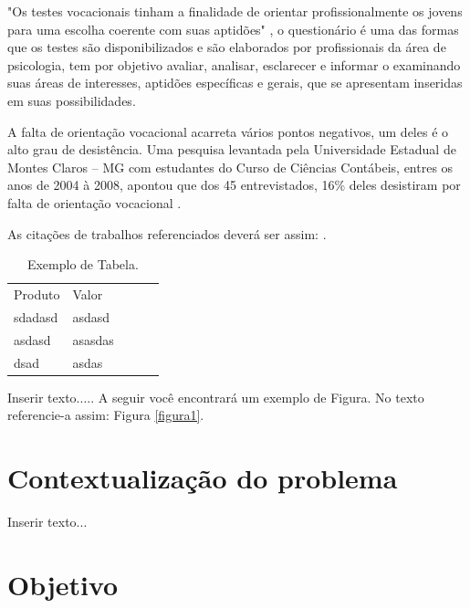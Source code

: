 \documentclass[
	12pt,				%
    oneside,			%
	a4paper,			%
	english,			%
	french,				%
	spanish,			%
	brazil,				%
	]{abntex2}
\begin{document}
"Os testes vocacionais tinham a finalidade de orientar profissionalmente os jovens para uma escolha coerente com suas aptidões" \cite{abade}, o questionário é uma das formas que os testes são disponibilizados e são elaborados por profissionais da área de psicologia, tem por objetivo avaliar, analisar, esclarecer e informar o examinando suas áreas de interesses, aptidões específicas e gerais, que se apresentam inseridas em suas possibilidades.

A falta de orientação vocacional acarreta vários pontos negativos, um deles é o alto grau de desistência. Uma pesquisa levantada pela Universidade Estadual de Montes Claros – MG com estudantes do Curso de Ciências Contábeis, entres os anos de 2004 à 2008, apontou que dos 45 entrevistados, 16\% deles desistiram por falta de orientação vocacional \cite{evasao}.


As citações de trabalhos referenciados deverá ser assim: \cite{f1}.


\begin{table}[hbt] %
\begin{center}
\caption{Exemplo de Tabela.} %
\begin{tabular}{|l|l|lll}
\cline{1-2}
Produto & Valor   &  &  &  \\ \cline{1-2}\cline{1-2}
sdadasd & asdasd  &  &  &  \\ \cline{1-2}
asdasd  & asasdas &  &  &  \\ \cline{1-2}
dsad    & asdas   &  &  &  \\ \cline{1-2}
\end{tabular}
\end{center}
\end{table}


Inserir texto.....
A seguir você encontrará um exemplo de Figura. No texto referencie-a assim: Figura \ref{figura1}.



\section{Contextualização do problema}

Inserir texto...


\section{Objetivo}
\end{document}
